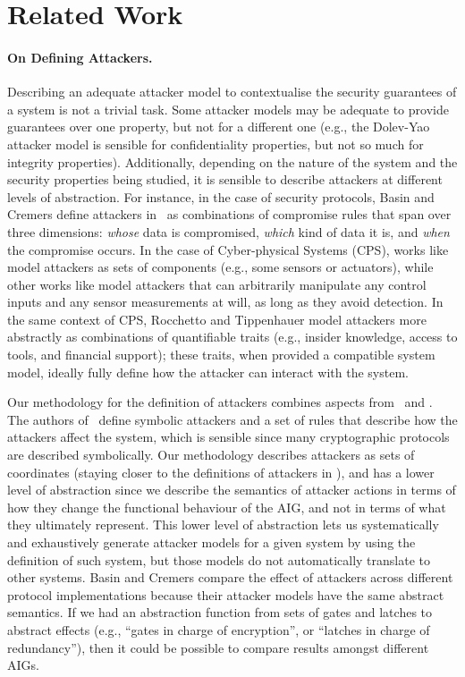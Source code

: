 \section{Related Work}
\label{sec:discussion}
\paragraph{On Defining Attackers.} Describing an adequate attacker model to contextualise the security guarantees of a system is not a trivial task. Some attacker models may be adequate to provide guarantees over one property, but not for a different one (e.g., the Dolev-Yao attacker model is sensible for confidentiality properties, but not so much for integrity properties). Additionally, depending on the nature of the system and the security properties being studied, it is sensible to describe attackers at different levels of abstraction. For instance, in the case of security protocols, Basin and Cremers define attackers in~\cite{KnowYourEnemy} as combinations of compromise rules that span over three dimensions:  \emph{whose} data is compromised, \emph{which} kind of data it is, and \emph{when} the compromise occurs. In the case of Cyber-physical Systems (CPS), works like \cite{Giraldo2018} model attackers as sets of components (e.g., some sensors or  actuators), while other works like \cite{IFCPSSec,Cardenas2011,Urbina2016} model attackers that can arbitrarily manipulate any control inputs and any sensor measurements at will, as long as they avoid detection. In the same context of CPS, Rocchetto and Tippenhauer \cite{CPSProfiles} model attackers more abstractly as combinations of quantifiable traits (e.g., insider knowledge, access to tools, and financial support); these traits, when provided a compatible system model, ideally fully define how the attacker can interact with the system. 


Our methodology for the definition of attackers combines aspects from~\cite{KnowYourEnemy} and \cite{Giraldo2018}. The authors of~\cite{KnowYourEnemy} define symbolic attackers and a set of rules that describe how the attackers affect the system, which is sensible since many cryptographic protocols are described symbolically. Our methodology describes attackers as sets of coordinates (staying closer to the definitions of attackers in \cite{Giraldo2018}), and has a lower level of abstraction since we describe the semantics of attacker actions in terms of how they change the functional behaviour of the AIG, and not in terms of what they ultimately represent. This lower level of abstraction lets us systematically and exhaustively generate attacker models for a given system by using the definition of such system, but those models do not automatically translate to other systems. Basin and Cremers compare the effect of attackers across different protocol implementations because their attacker models have the same abstract semantics. If we had an abstraction function from sets of gates and latches to abstract effects (e.g., ``gates in charge of encryption'', or ``latches in charge of redundancy''), then it could be possible to compare results amongst different AIGs.

